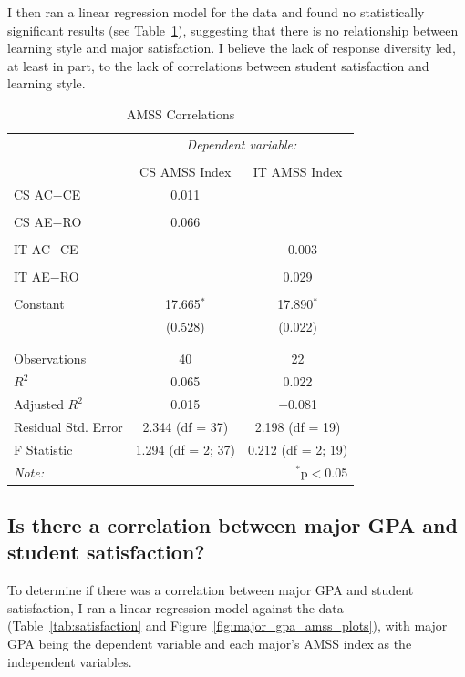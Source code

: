 I then ran a linear regression model for the data and found no statistically significant results (see Table~\ref{tab:amss_corr}), suggesting that there is no relationship between learning style and major satisfaction. I believe the lack of response diversity led, at least in part, to the lack of correlations between student satisfaction and learning style.

\begin{table}[!htbp] \centering
  \caption{AMSS Correlations}
  \label{tab:amss_corr}
  \begin{tabular}{@{\extracolsep{5pt}}lcc}
    \toprule
    & \multicolumn{2}{c}{\textit{Dependent variable:}} \\
    \cline{2-3}
    \\[-1.8ex] & CS AMSS Index & IT AMSS Index \\
    \midrule
    CS AC$-$CE & 0.011 &  \\
    & & \\
    CS AE$-$RO & 0.066 &  \\
    & & \\
    IT AC$-$CE &  & $-$0.003 \\
    & & \\
    IT AE$-$RO &  & 0.029 \\
    & & \\
    Constant & 17.665$^{*}$ & 17.890$^{*}$ \\
    & (0.528) & (0.022) \\
    & & \\
    \hline \\[-1.8ex]
    Observations & 40 & 22 \\
    $R^{2}$ & 0.065 & 0.022 \\
    Adjusted $R^{2}$ & 0.015 & $-$0.081 \\
    Residual Std. Error & 2.344 (df = 37) & 2.198 (df = 19) \\
    F Statistic & 1.294 (df = 2; 37) & 0.212 (df = 2; 19) \\
    \bottomrule
    \textit{Note:}  & \multicolumn{2}{r}{$^{*}$p$<$0.05} \\
  \end{tabular}
\end{table}

\subsection{Is there a correlation between major GPA and student satisfaction?}
To determine if there was a correlation between major GPA and student satisfaction, I ran a linear regression model against the data (Table~\ref{tab:satisfaction} and Figure~\ref{fig:major_gpa_amss_plots}), with major GPA being the dependent variable and each major's AMSS index as the independent variables.

